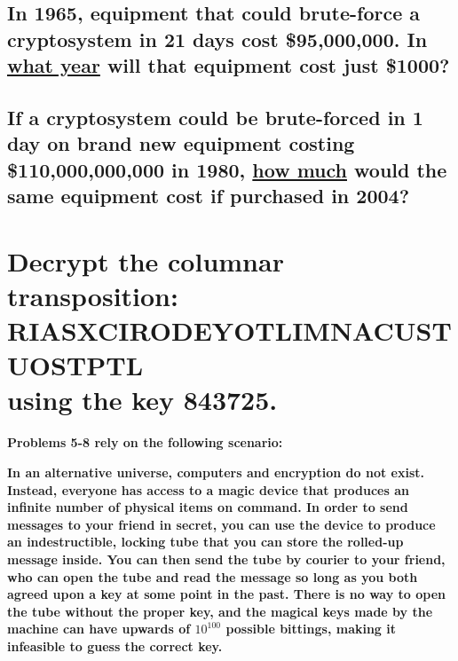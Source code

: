 \documentclass[12pt]{article}
\begin{document}
\newpage

\subsection{In 1965, equipment that could brute-force a cryptosystem in 21 days cost \$95,000,000.  In \underline{what year} will that equipment cost just \$1000?}

\vspace{9cm}

\subsection{If a cryptosystem could be brute-forced in 1 day on brand new equipment costing \$110,000,000,000 in 1980, \underline{how much} would the same equipment cost if purchased in 2004?}

\newpage

\section{Decrypt the columnar transposition: \\ RIASXCIRODEYOTLIMNACUSTUOSTPTL \\ using the key 843725.}

\vspace{9cm}

\textbf{Problems 5-8 rely on the following scenario:}

\textbf{In an alternative universe, computers and encryption do not exist.  Instead, everyone has access to a magic device that produces an infinite number of physical items on command.  In order to send messages to your friend in secret, you can use the device to produce an indestructible, locking tube that you can store the rolled-up message inside.  You can then send the tube by courier to your friend, who can open the tube and read the message so long as you both agreed upon a key at some point in the past.  There is no way to open the tube without the proper key, and the magical keys made by the machine can have upwards of $10^{100}$ possible bittings, making it infeasible to guess the correct key.}
\end{document}
